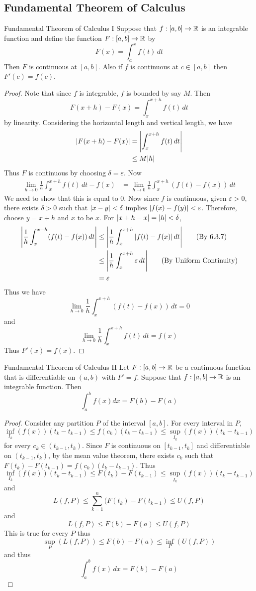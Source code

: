 \documentclass[a4paper]{article}
\begin{document}
\subsection{Fundamental Theorem of Calculus}
\begin{thm}{Fundamental Theorem of Calculus I}{} Suppose that $f:[a,b]\to\mathbb{R}$ is an integrable function and define the function $F:[a,b]\to\mathbb{R}$ by $$F(x)=\int_{a}^{x}f(t)\,dt$$ Then $F$ is continuous at $[a,b]$. Also if $f$ is continuous at $c\in[a,b]$ then $F'(c)=f(c)$. \tcbline
\begin{proof}
Note that since $f$ is integrable, $f$ is bounded by say $M$. Then $$F(x+h)-F(x)=\int_x^{x+h}f(t)\,dt$$ by linearity. Considering the horizontal length and vertical length, we have
\begin{align*}
\abs{F(x+h)-F(x)}&=\abs{\int_x^{x+h}f(t)\,dt}\\
&\leq M\abs{h}
\end{align*}
Thus $F$ is continuous by choosing $\delta=\varepsilon$. 
Now 
\begin{align*}
\lim_{h\to 0}\frac{1}{h}\int_x^{x+h}f(t)\,dt-f(x)&=\lim_{h\to 0}\frac{1}{h}\int_x^{x+h}(f(t)-f(x))\,dt
\end{align*}
We need to show that this is equal to $0$. Now since $f$ is continuous, given $\varepsilon>0$, there exists $\delta>0$ such that $\abs{x-y}<\delta$ implies $\abs{f(x)-f(y)}<\varepsilon$. Therefore, choose $y=x+h$ and $x$ to be $x$. For $\abs{x+h-x}=\abs{h}<\delta$, 
\begin{align*}
\abs{\frac{1}{h}\int_x^{x+h}(f(t)-f(x))\,dt}&\leq\abs{\frac{1}{h}\int_x^{x+h}\abs{f(t)-f(x)}\,dt}\tag{By 6.3.7}\\
&\leq\abs{\frac{1}{h}\int_x^{x+h}\varepsilon\,dt}\tag{By Uniform Continuity}\\
&=\varepsilon
\end{align*}
Thus we have $$\lim_{h\to 0}\frac{1}{h}\int_x^{x+h}(f(t)-f(x))\,dt=0$$ and $$\lim_{h\to 0}\frac{1}{h}\int_x^{x+h}f(t)\,dt=f(x)$$
Thus $F'(x)=f(x)$. 
\end{proof}
\end{thm}

\begin{thm}{Fundamental Theorem of Calculus II}{} Let $F:[a,b]\to\mathbb{R}$ be a continuous function that is differentiable on $(a,b)$ with $F'=f$. Suppose that $f:[a,b]\to\mathbb{R}$ is an integrable function. Then $$\int_{a}^{b}f(x)dx=F(b)-F(a)$$ \tcbline
\begin{proof}
Consider any partition $P$ of the interval $[a,b]$. For every interval in $P$, $$\inf_{I_k}(f(x))(t_k-t_{k-1})\leq f(c_k)(t_k-t_{k-1})\leq\sup_{I_k}(f(x))(t_k-t_{k-1})$$
for every $c_k\in(t_{k-1},t_k)$. Since $F$ is continuous on $[t_{k-1},t_k]$ and differentiable on $(t_{k-1},t_k)$, by the mean value theorem, there exists $c_k$ such that $F(t_k)-F(t_{k-1})=f(c_k)(t_k-t_{k-1})$. Thus $$\inf_{I_k}(f(x))(t_k-t_{k-1})\leq F(t_k)-F(t_{k-1})\leq\sup_{I_k}(f(x))(t_k-t_{k-1})$$ and $$L(f,P)\leq\sum_{k=1}^n(F(t_k)-F(t_{k-1})\leq U(f,P)$$ and $$L(f,P)\leq F(b)-F(a)\leq U(f,P)$$ This is true for every $P$ thus $$\sup_{P}(L(f,P))\leq F(b)-F(a)\leq\inf_{P}(U(f,P))$$ and thus $$\int_a^bf(x)\,dx=F(b)-F(a)$$
\end{proof}
\end{thm}
\end{document}
